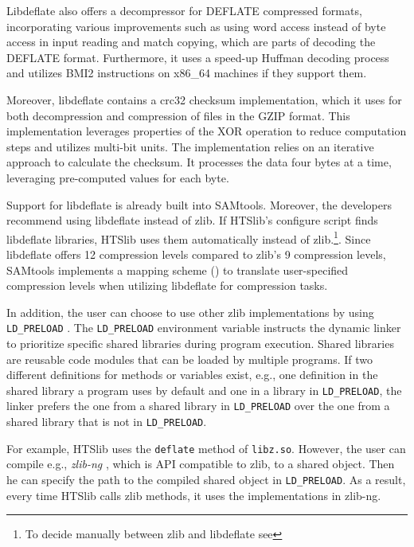Libdeflate also offers a decompressor for DEFLATE compressed formats, incorporating various improvements such as using word access instead of byte access in input reading and match copying, which are parts of decoding the DEFLATE format. Furthermore, it uses a speed-up Huffman decoding process and utilizes BMI2 instructions on x86\_64 machines if they support them.

Moreover, libdeflate contains a crc32 checksum implementation, which it uses for both decompression and compression of files in the GZIP format. This implementation leverages properties of the XOR operation to reduce computation steps and utilizes multi-bit units. The implementation relies on an iterative approach to calculate the checksum. It processes the data four bytes at a time, leveraging pre-computed values for each byte.

Support for libdeflate is already built into SAMtools. Moreover, the developers recommend using libdeflate instead of zlib. If HTSlib's configure script finds libdeflate libraries, HTSlib uses them automatically instead of zlib.\footnote{To decide manually between zlib and libdeflate see }. Since libdeflate offers 12 compression levels compared to zlib's 9 compression levels, SAMtools implements a mapping scheme () to translate user-specified compression levels when utilizing libdeflate for compression tasks.


In addition, the user can choose to use other zlib implementations by using \texttt{LD\_PRELOAD} \cite{myers_intercepting_nodate-1}. 
The \texttt{LD\_PRELOAD} environment variable instructs the dynamic linker to prioritize specific shared libraries during program execution. Shared libraries are reusable code modules that can be loaded by multiple programs. If two different definitions for methods or variables exist, e.g., one definition in the shared library a program uses by default and one in a library in \texttt{LD\_PRELOAD}, the linker prefers the one from a shared library in \texttt{LD\_PRELOAD} over the one from a shared library that is not in \texttt{LD\_PRELOAD}. 

For example, HTSlib uses the \texttt{deflate} method of \texttt{libz.so}. However, the user can compile e.g., \textit{zlib-ng} \cite{noauthor_zlib-ngzlib-ng_2024}, which is API compatible to zlib, to a shared object. Then he can specify the path to the compiled shared object in \texttt{LD\_PRELOAD}. As a result, every time HTSlib calls zlib methods, it uses the implementations in zlib-ng. 

